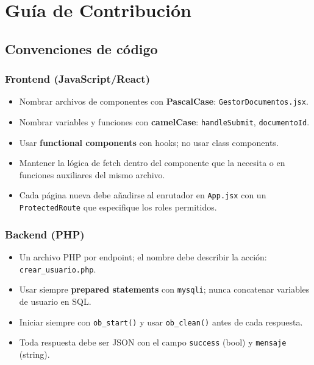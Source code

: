 \documentclass[10pt,letterpaper]{report}
\begin{document}
\chapter{Guía de Contribución}

\section{Convenciones de código}

\subsection{Frontend (JavaScript/React)}

\begin{itemize}
  \item Nombrar archivos de componentes con \textbf{PascalCase}: \texttt{GestorDocumentos.jsx}.
  \item Nombrar variables y funciones con \textbf{camelCase}: \texttt{handleSubmit}, \texttt{documentoId}.
  \item Usar \textbf{functional components} con hooks; no usar class components.
  \item Mantener la lógica de fetch dentro del componente que la necesita o en funciones auxiliares del mismo archivo.
  \item Cada página nueva debe añadirse al enrutador en \texttt{App.jsx} con un \texttt{ProtectedRoute} que especifique los roles permitidos.
\end{itemize}

\subsection{Backend (PHP)}

\begin{itemize}
  \item Un archivo PHP por endpoint; el nombre debe describir la acción: \texttt{crear\_usuario.php}.
  \item Usar siempre \textbf{prepared statements} con \texttt{mysqli}; nunca concatenar variables de usuario en SQL.
  \item Iniciar siempre con \texttt{ob\_start()} y usar \texttt{ob\_clean()} antes de cada respuesta.
  \item Toda respuesta debe ser JSON con el campo \texttt{success} (bool) y \texttt{mensaje} (string).
\end{itemize}
\end{document}
